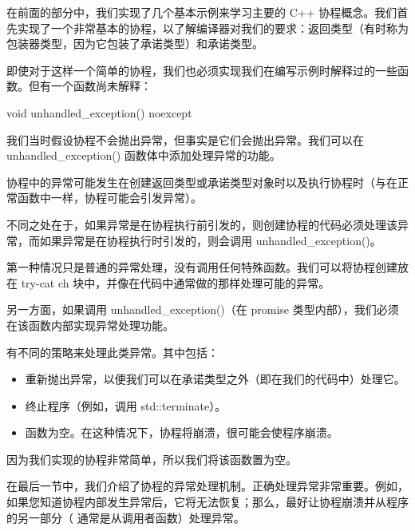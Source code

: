在前面的部分中，我们实现了几个基本示例来学习主要的 C++ 协程概念。我们首先实现了一个非常基本的协程，以了解编译器对我们的要求：返回类型（有时称为包装器类型，因为它包装了承诺类型）和承诺类型。

即使对于这样一个简单的协程，我们也必须实现我们在编写示例时解释过的一些函数。但有一个函数尚未解释：

\begin{cpp}
void unhandled_exception() noexcept {}
\end{cpp}

我们当时假设协程不会抛出异常，但事实是它们会抛出异常。我们可以在 unhandled\_exception() 函数体中添加处理异常的功能。

协程中的异常可能发生在创建返回类型或承诺类型对象时以及执行协程时（与在正常函数中一样，协程可能会引发异常）。

不同之处在于，如果异常是在协程执行前引发的，则创建协程的代码必须处理该异常，而如果异常是在协程执行时引发的，则会调用 unhandled\_exception()。

第一种情况只是普通的异常处理，没有调用任何特殊函数。我们可以将协程创建放在 try-cat ch 块中，并像在代码中通常做的那样处理可能的异常。

另一方面，如果调用 unhandled\_exception()（在 promise 类型内部），我们必须在该函数内部实现异常处理功能。

有不同的策略来处理此类异常。其中包括：

\begin{itemize}
\item
重新抛出异常，以便我们可以在承诺类型之外（即在我们的代码中）处理它。

\item
终止程序（例如，调用 std::terminate）。

\item
函数为空。在这种情况下，协程将崩溃，很可能会使程序崩溃。
\end{itemize}

因为我们实现的协程非常简单，所以我们将该函数置为空。

在最后一节中，我们介绍了协程的异常处理机制。正确处理异常非常重要。例如，如果您知道协程内部发生异常后，它将无法恢复；那么，最好让协程崩溃并从程序的另一部分（ 通常是从调用者函数）处理异常。






